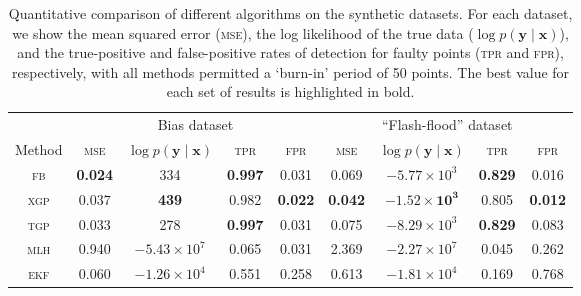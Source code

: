 \documentclass{article}
\newcommand{\given}{\ensuremath{\mid}}
\newcommand{\bm}[1]{\ensuremath{\mathbf{#1}}}
\begin{document}
\begin{table}
  \begin{center}
  \caption{Quantitative comparison of different algorithms on the
    synthetic datasets.  For each dataset, we show the mean squared error
    (\textsc{mse}), the log likelihood of the true data ($\log p(\bm{y}
    \given \bm{x})$), and the true-positive and false-positive rates
    of detection for faulty points (\textsc{tpr} and \textsc{fpr}),
    respectively, with all methods permitted a `burn-in' period of 50 points. The best value for each set of results is highlighted in
    bold.}
  \label{tbl:results}
  \begin{tabular}{ccccccccc}
    \toprule
& \multicolumn{4}{c}{Bias dataset} & \multicolumn{4}{c}{``Flash-flood'' dataset}\\
    \cmidrule(l){2-5} \cmidrule(l){6-9}
    Method & \scshape{mse} & $\log p(\bm{y}\given\bm{x})$ & \scshape{tpr} & \scshape{fpr} 
& \scshape{mse} & $\log p(\bm{y}\given\bm{x})$ & \scshape{tpr} & \scshape{fpr} \\
\midrule
    \scshape{fb} & \textbf{0.024} & 334 & \textbf{0.997} & 0.031 & 0.069 & $-5.77\times 10^3$ & \textbf{0.829} & {0.016} \\
    \scshape{xgp} & 0.037 & \textbf{439} & 0.982 & \textbf{0.022} & \textbf{0.042} & $\mathbf{-1.52 \times 10^3}$ & 0.805 & \textbf{0.012} \\
    \scshape{tgp} & 0.033 & 278 & \textbf{0.997} & 0.031 & 0.075 & $-8.29\times 10^3$ & \textbf{0.829} & 0.083 \\
    \scshape{mlh} & 0.940 & $-5.43\times 10^7$ & 0.065 & 0.031 & 2.369 & $-2.27\times 10^7$ & 0.045 & 0.262 \\
   \scshape{ekf} & 0.060 & $-1.26 \times 10^4$ & 0.551 & 0.258 & 0.613 & $-1.81\times 10^4$ & 0.169 & 0.768 \\
    \bottomrule
  \end{tabular}
  \end{center}
\end{table}

\end{document}
